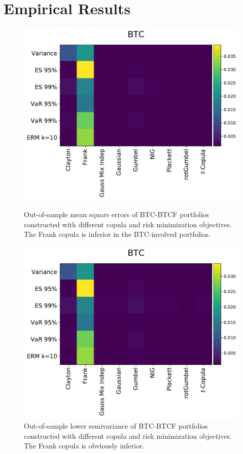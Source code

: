 \section{Empirical Results}\label{sec:results}

\begin{figure}[t]
\centering
\begin{minipage}[t]{.475\textwidth}
    \centering
    \includegraphics[width=\textwidth]{_pics/MSE_BTC.pdf}
  \caption{Out-of-sample mean square errors of BTC-BTCF portfolios constructed with different copula and risk minimization objectives.
    The Frank copula is inferior in the BTC-involved portfolios.}
\label{fig:MSE_BTC}
\end{minipage}
\hfill
\begin{minipage}[t]{.475\textwidth}
    \centering
    \includegraphics[width=\textwidth]{_pics/semiLowerVariance_BTC.pdf}
  \caption{Out-of-sample lower semivariance of BTC-BTCF portfolios constructed with different copula and risk minimization objectives.
  The Frank copula is obviously inferior.}
\label{fig:SLV_BTC}
\end{minipage}
\end{figure}


